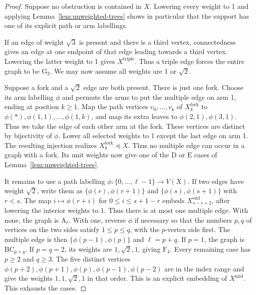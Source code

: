 \documentclass[11pt]{amsart}
\theoremstyle{definition}
\newcommand{\typ}[1]{\mathrm{#1}}
\begin{document}
\begin{proof}
Suppose no obstruction is contained in $X$. Lowering every weight to 1
and applying Lemma~\ref{lem:unweighted-trees} shows in particular that
the support has one of its explicit path or arm labellings.

If an edge of weight $\sqrt3$ is present and there is a third vertex,
connectedness gives an edge at one endpoint of that edge leading towards
a third vertex. Lowering the latter weight to 1 gives $X^{\mathrm{triple}}$.
Thus a triple edge forces the entire graph to be $\typ G_2$.
We may now assume all weights are 1 or $\sqrt2$.

Suppose a fork and a $\sqrt2$ edge are both present. There is just one
fork. Choose its arm labelling $\phi$ and permute the arms to put
the multiple edge on arm 1, ending at position $k\geq1$.
Map the path vertices $v_0,\ldots,v_k$ of $X^{\mathrm{fork}}_k$ to
$\phi(*),\phi(1,1),\ldots,\phi(1,k)$, and map its extra leaves
to $\phi(2,1),\phi(3,1)$. Thus we take the edge of each other arm
at the fork. These vertices are distinct by bijectivity of $\phi$.
Lower all selected weights to 1 except the last edge on arm 1.
The resulting injection realizes $X^{\mathrm{fork}}_k\preccurlyeq X$.
Thus no multiple edge can occur
in a graph with a fork. Its unit weights now give one of the $\typ D$
or $\typ E$ cases of Lemma~\ref{lem:unweighted-trees}.

It remains to use a path labelling
$\phi:\{0,\ldots,\ell-1\}\to V(X)$.
If two edges have weight $\sqrt2$, write them as
$\{\phi(r),\phi(r+1)\}$ and $\{\phi(s),\phi(s+1)\}$ with $r<s$.
The map $i\mapsto\phi(r+i)$ for $0\leq i\leq s+1-r$ embeds
$X^{\mathrm{end}}_{s-r+2}$, after lowering the interior weights to 1.
Thus there is at most one multiple edge. With none, the graph is
$\typ A_\ell$. With one, reverse $\phi$ if necessary so that the
numbers $p,q$ of vertices on the two sides satisfy $1\leq p\leq q$,
with the $p$-vertex side first. The multiple edge is then
$\{\phi(p-1),\phi(p)\}$ and $\ell=p+q$.
If $p=1$, the graph is $\typ{BC}_{p+q}$. If $p=q=2$, its weights are
$1,\sqrt2,1$, giving $\typ F_4$. Every remaining case has $p\geq2$
and $q\geq3$. The five distinct vertices
$\phi(p+2),\phi(p+1),\phi(p),\phi(p-1),\phi(p-2)$ are in the
index range and give the weights $1,1,\sqrt2,1$ in that order.
This is an explicit embedding of $X^{\mathrm{mid}}$. This exhausts the cases.


\end{proof}
\end{document}
